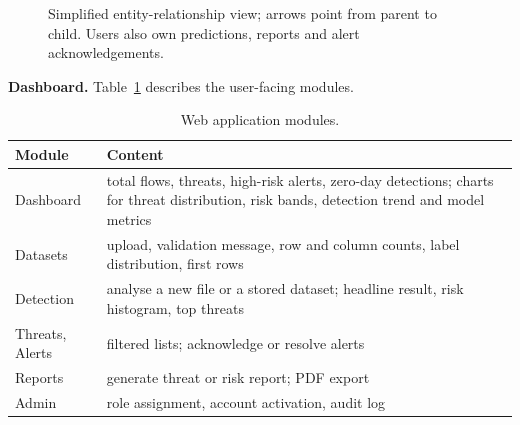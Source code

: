 \documentclass[conference]{IEEEtran}
\begin{document}
\begin{figure}[!htb]
\centering
{}
\caption{Simplified entity-relationship view; arrows point from parent to child. Users also own predictions, reports and alert acknowledgements.}
\label{fig:er}
\end{figure}

\textbf{Dashboard.} Table~\ref{tab:dash} describes the user-facing modules.

\begin{table}[!htb]
\caption{Web application modules.}
\label{tab:dash}
\centering\footnotesize
\begin{tabular}{@{}p{1.7cm}p{5.6cm}@{}}
\hline
Module & Content \\
\hline
Dashboard & total flows, threats, high-risk alerts, zero-day detections; charts for threat distribution, risk bands, detection trend and model metrics \\
Datasets & upload, validation message, row and column counts, label distribution, first rows \\
Detection & analyse a new file or a stored dataset; headline result, risk histogram, top threats \\
Threats, Alerts & filtered lists; acknowledge or resolve alerts \\
Reports & generate threat or risk report; PDF export \\
Admin & role assignment, account activation, audit log \\
\hline
\end{tabular}
\end{table}
\end{document}
